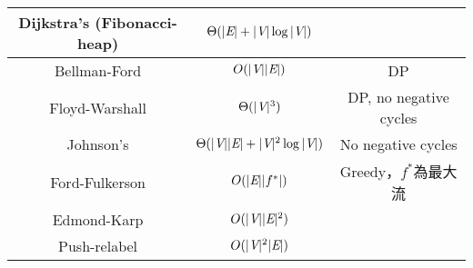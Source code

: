 \begin{enumerate}
\begin{table}[H]
\begin{tabular}{|c|c|c|}
            \cline{1-2}
            Dijkstra's (Fibonacci-heap) & $\Theta(|\textit{E}| + |\textit{V}|\log|\textit{V}|)$ &  \\
            \hline
            Bellman-Ford & $O(|\textit{V}||\textit{E}|)$ & DP \\
            \hline
            Floyd-Warshall & $\Theta(|\textit{V}|^3)$ & DP, no negative cycles \\
            \hline
            Johnson's & $\Theta(|\textit{V}||\textit{E}| + |\textit{V}|^2\log |\textit{V}|)$ & No negative cycles \\
            \hline
            Ford-Fulkerson & $O(|\textit{E}||f^*|)$ & Greedy，$f^*$為最大流 \\
            \hline
            Edmond-Karp & $O(|\textit{V}||\textit{E}|^2)$ & \\
            \hline
            Push-relabel & $O(|\textit{V}|^2|\textit{E}|)$ & \\
            \hline
        \end{tabular}
    \end{table}
\end{enumerate}

\pagebreak